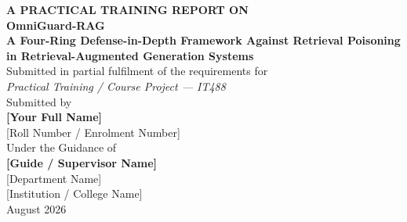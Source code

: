 \begin{titlepage}
\begin{center}

\vspace*{2.2cm}
{\large\color{slate}\bfseries A PRACTICAL TRAINING REPORT ON}\\[1.6cm]

{\fontsize{30}{36}\selectfont\bfseries\color{navy} OmniGuard-RAG}\\[0.7cm]

{\Large\bfseries\color{slate}
A Four-Ring Defense-in-Depth Framework Against Retrieval Poisoning\\
in Retrieval-Augmented Generation Systems}\\[1.6cm]

{\large Submitted in partial fulfilment of the requirements for}\\[0.2cm]
{\large\itshape Practical Training / Course Project --- IT488}\\[1.8cm]

{\large Submitted by}\\[0.25cm]
{\Large\bfseries\color{navy} [Your Full Name]}\\[0.15cm]
{\large [Roll Number / Enrolment Number]}\\[1.8cm]

{\large Under the Guidance of}\\[0.25cm]
{\Large\bfseries\color{navy} [Guide / Supervisor Name]}\\[2.2cm]

{\large [Department Name]}\\[0.15cm]
{\large [Institution / College Name]}\\[0.15cm]
{\large August 2026}

\end{center}
\end{titlepage}
